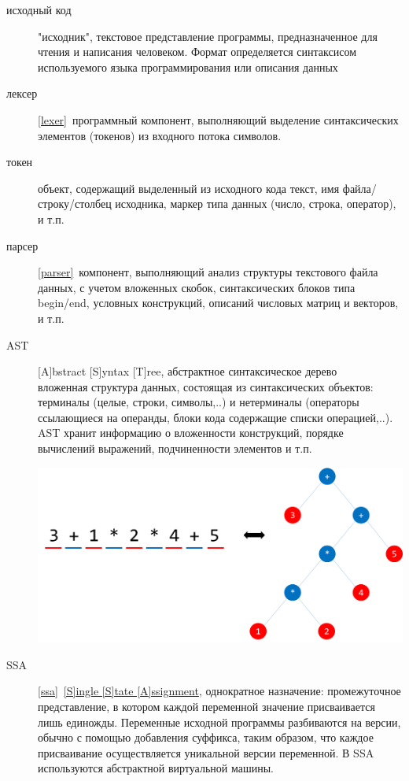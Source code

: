 \label{compiler}\secdown


\begin{description}
\item[исходный код] "исходник", текстовое представление программы,
предназначенное для чтения и написания человеком. Формат определяется
синтаксисом используемого языка программирования или описания данных 
\item[лексер] \ref{lexer}\ программный компонент, выполняющий выделение 
синтаксических элементов (токенов) из входного потока символов.
\item[токен] объект, содержащий выделенный из исходного кода текст,
имя файла/строку/столбец исходника, маркер типа данных (число, строка, оператор),
и т.п.
\item[парсер] \ref{parser}\ компонент, выполняющий анализ структуры текстового файла данных,
с учетом вложенных скобок, синтаксических блоков типа begin/end, условных конструкций,
описаний числовых матриц и векторов, и т.п.
\item[AST] [A]bstract [S]yntax [T]ree, абстрактное синтаксическое дерево\\
вложенная структура данных, состоящая из синтаксических объектов: 
терминалы (целые, строки, символы,..) и нетерминалы (операторы ссылающиеся на операнды,
блоки кода содержащие списки операцией,..). AST хранит информацию о вложенности конструкций,
порядке вычислений выражений, подчиненности элементов и т.п.

\noindent\includegraphics[height=0.5\textheight]{fig/ast.png}

\item[SSA] \ref{ssa}\ \href{https://ru.wikipedia.org/wiki/SSA}{[S]ingle [S]tate
[A]ssignment}, 
однократное назначение: промежуточное представление, в котором каждой переменной 
значение присваивается лишь единожды. Переменные исходной программы разбиваются 
на версии, обычно с помощью добавления суффикса, таким образом, что каждое 
присваивание осуществляется уникальной версии переменной.
В SSA используются  
абстрактной виртуальной машины. 

  
\end{description}

